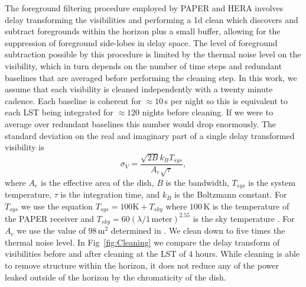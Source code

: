 \documentclass[twocolumn]{emulateapj}
\begin{document}
The foreground filtering procedure employed by PAPER and HERA involves delay transforming the visibilities and performing a 1d clean which discovers and subtract foregrounds within the horizon plus a small buffer, allowing for the suppression of foreground side-lobes in delay space. The level of foreground subtraction possible by this procedure is limited by the thermal noise level on the visibility, which in turn depends on the number of time steps and redundant baselines that are averaged before performing the cleaning step. In this work, we assume that each visibility is cleaned independently with a twenty minute cadence. Each baseline is coherent for $\approx 10$\,s per night so this is equivalent to each LST being integrated for $\approx 120$ nights before cleaning. If we were to average over redundant baselines this number would drop enormously. The standard deviation on the real and imaginary part of a single delay transformed visibility is \citep{Morales:2004}
\begin{equation}
\sigma_V = \frac{\sqrt{2 B} k_B T_{sys}}{A_e \sqrt{\tau}},
\end{equation}
where $A_e$ is the effective area of the dish, $B$ is the bandwidth, $T_{sys}$ is the system temperature, $\tau$ is the integration time, and $k_B$ is the Boltzmann constant. For $T_{sys}$ we use the equation $T_{sys} = 100\text{K} + T_{sky}$ where $100$\,K is the temperature of the PAPER receiver and $T_{sky} = 60 (\lambda/1\,\text{meter} )^{2.55}$ is the sky temperature \citep{Fixsen:2011}. For $A_e$ we use the value of $98$\,m$^2$ determined in \citet{Neben:2016}. We clean down to five times the thermal noise level. In Fig~\ref{fig:Cleaning} we compare the delay transform of visibilities before and after cleaning at the LST of 4 hours. While cleaning is able to remove structure within the horizon, it does not reduce any of the power leaked outside of the horizon by the chromaticity of the dish. 
\end{document}
